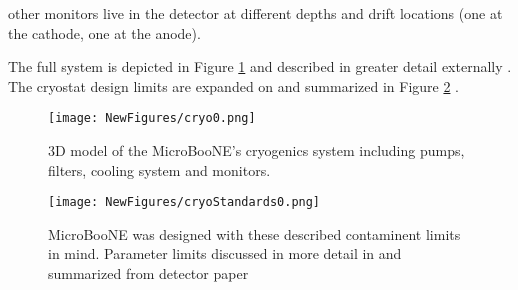 \documentclass[12pt]{article}
\begin{document}
 other monitors live in the detector at different depths and drift locations (one at the cathode, one at the anode). 
\par The full system is depicted in Figure \ref{fig:cryo0} and described in greater detail externally \cite{bib:purity} \cite{bib:purity2}. The cryostat design limits are expanded on and summarized in Figure \ref{fig:cryo1} \cite{bib:uboone_JINST}.

\begin{figure}[h!]
\centering
\texttt{[image: NewFigures/cryo0.png]}
\caption{ 3D model of the MicroBooNE's cryogenics system including pumps, filters, cooling system and monitors.  } 
\label{fig:cryo0}
\end{figure}
  

\begin{figure}[h!]
\centering
\texttt{[image: NewFigures/cryoStandards0.png]}
\caption{ MicroBooNE was designed with these described contaminent limits in mind. Parameter limits discussed in more detail in and summarized from detector paper \cite{bib:uboone_JINST} }
\label{fig:cryo1}
\end{figure}

\end{document}
